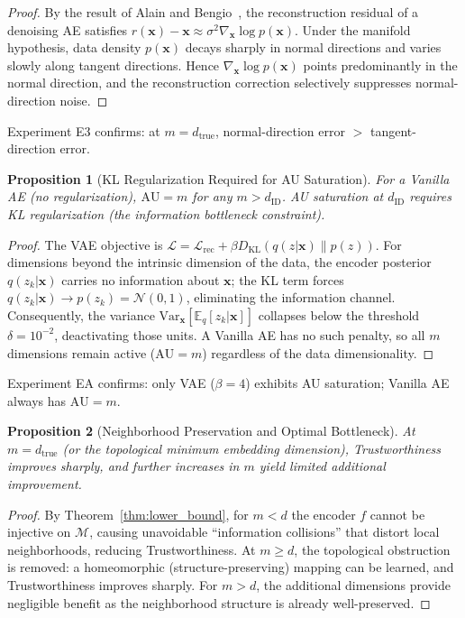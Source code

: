 \documentclass[lettersize,journal]{IEEEtran}
\newcommand{\dID}{d_{\mathrm{ID}}}
\newcommand{\dtrue}{d_{\mathrm{true}}}
\newtheorem{proposition}{Proposition}
\begin{document}
\begin{proof}
By the result of Alain and Bengio~\cite{alain2014dae}, the reconstruction residual of a denoising AE satisfies
$r(\boldsymbol{x}) - \boldsymbol{x} \approx \sigma^2 \nabla_{\boldsymbol{x}}\log p(\boldsymbol{x})$.
Under the manifold hypothesis, data density $p(\boldsymbol{x})$ decays sharply in normal directions and varies slowly along tangent directions.
Hence $\nabla_{\boldsymbol{x}}\log p(\boldsymbol{x})$ points predominantly in the normal direction,
and the reconstruction correction selectively suppresses normal-direction noise.
\end{proof}

Experiment E3 confirms: at $m = \dtrue$, normal-direction error $>$ tangent-direction error.

\begin{proposition}[KL Regularization Required for AU Saturation]\label{thm:au}
For a Vanilla AE (no regularization), $\mathrm{AU} = m$ for any $m > \dID$.
AU saturation at $\dID$ requires KL regularization (the information bottleneck constraint).
\end{proposition}

\begin{proof}
The VAE objective is $\mathcal{L} = \mathcal{L}_{\mathrm{rec}} + \beta D_{\mathrm{KL}}(q(z|\boldsymbol{x})\|p(z))$.
For dimensions beyond the intrinsic dimension of the data, the encoder posterior $q(z_k|\boldsymbol{x})$ carries no information
about $\boldsymbol{x}$; the KL term forces $q(z_k|\boldsymbol{x}) \to p(z_k) = \mathcal{N}(0,1)$, eliminating the information channel.
Consequently, the variance $\mathrm{Var}_{\boldsymbol{x}}[\mathbb{E}_q[z_k|\boldsymbol{x}]]$ collapses below the threshold $\delta = 10^{-2}$,
deactivating those units.
A Vanilla AE has no such penalty, so all $m$ dimensions remain active ($\mathrm{AU} = m$) regardless of the data dimensionality.
\end{proof}

Experiment EA confirms: only VAE ($\beta=4$) exhibits AU saturation; Vanilla AE always has $\mathrm{AU} = m$.

\begin{proposition}[Neighborhood Preservation and Optimal Bottleneck]\label{thm:trust}
At $m = \dtrue$ (or the topological minimum embedding dimension), Trustworthiness improves sharply, and further increases in $m$ yield limited additional improvement.
\end{proposition}

\begin{proof}
By Theorem~\ref{thm:lower_bound}, for $m < d$ the encoder $f$ cannot be injective on $\mathcal{M}$, causing
unavoidable ``information collisions'' that distort local neighborhoods, reducing Trustworthiness.
At $m \geq d$, the topological obstruction is removed: a homeomorphic (structure-preserving) mapping can be learned,
and Trustworthiness improves sharply.
For $m > d$, the additional dimensions provide negligible benefit as the neighborhood structure is already well-preserved.
\end{proof}
\end{document}

